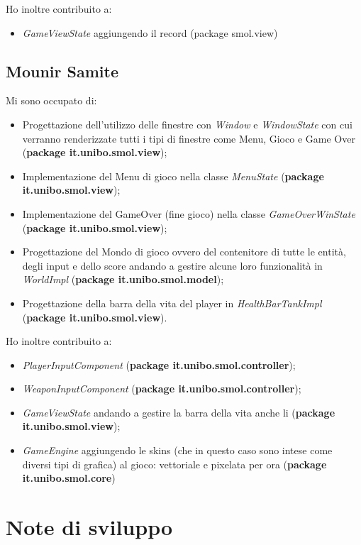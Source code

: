 \documentclass[a4paper,12pt]{report}
\begin{document}
Ho inoltre contribuito a:
\begin{itemize}
    \item \emph{GameViewState} aggiungendo il record (package smol.view)
\end{itemize}

\subsection*{Mounir Samite}
Mi sono occupato di:
\begin{itemize}
    \item Progettazione dell'utilizzo delle finestre con \emph{Window} e \emph{WindowState} con cui verranno renderizzate tutti i tipi di finestre come Menu, Gioco e Game Over (\textbf{package it.unibo.smol.view});
    \item Implementazione del Menu di gioco nella classe \emph{MenuState} (\textbf{package it.unibo.smol.view});
    \item Implementazione del GameOver (fine gioco) nella classe \emph{GameOverWinState} (\textbf{package it.unibo.smol.view});
    \item Progettazione del Mondo di gioco ovvero del contenitore di tutte le entità, degli input e dello score andando a gestire alcune loro funzionalità in \emph{WorldImpl} (\textbf{package it.unibo.smol.model});
    \item Progettazione della barra della vita del player in \emph{HealthBarTankImpl} (\textbf{package it.unibo.smol.view}).
\end{itemize}
Ho inoltre contribuito a:
\begin{itemize}
    \item \emph{PlayerInputComponent} (\textbf{package it.unibo.smol.controller});
    \item \emph{WeaponInputComponent} (\textbf{package it.unibo.smol.controller});
    \item \emph{GameViewState} andando a gestire la barra della vita anche li (\textbf{package it.unibo.smol.view});
    \item \emph{GameEngine} aggiungendo le skins (che in questo caso sono intese come diversi tipi di grafica) al gioco: vettoriale e pixelata per ora (\textbf{package it.unibo.smol.core}) 
\end{itemize}

\section{Note di sviluppo}
\end{document}
